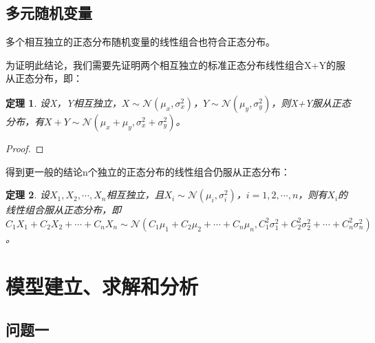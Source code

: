 \documentclass[UTF8]{ctexart}
\newtheorem{pro}{定理}
\begin{document}
	\subsection{多元随机变量}
	多个相互独立的正态分布随机变量的线性组合也符合正态分布。
	
	为证明此结论，我们需要先证明两个相互独立的标准正态分布线性组合X+Y的服从正态分布，即：
	\begin{pro}
		设X，Y相互独立，$X\sim\mathcal{N}(\mu_{x},\sigma_{x}^2)$，$Y\sim\mathcal{N}(\mu_{y},\sigma_{y}^2)$，则X+Y服从正态分布，有$X+Y\sim\mathcal{N}(\mu_{x}+\mu_{y},\sigma_{x}^2+\sigma_{y}^2)$。
	\end{pro}

	\begin{proof}
		
	\end{proof}
	
	得到更一般的结论n个独立的正态分布的线性组合仍服从正态分布：
	
	\begin{pro}
		设$X_{1},X_{2},\cdots,X_n$相互独立，且$X_i\sim\mathcal{N}(\mu_{i},\sigma_{i}^2)$，$i=1,2,\cdots,n$，则有$X_{i}$的线性组合服从正态分布，即$C_1 X_1+C_2 X_2+\cdots +C_n X_n\sim\mathcal{N}(C_1\mu_1+C_2\mu_2+\cdots+C_n\mu_n,C_{1}^2\sigma_{1}^2+C_{2}^2\sigma_{2}^2+\cdots+C_{n}^2\sigma_{n}^2)$。
	\end{pro}
	
	
	\section{模型建立、求解和分析}
	\subsection{问题一}
\end{document}
